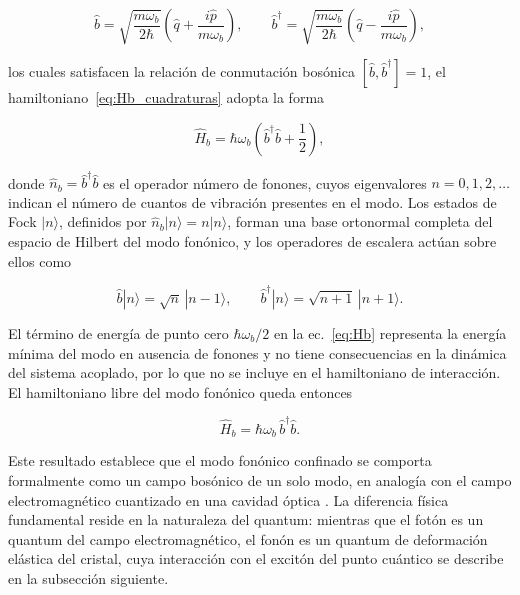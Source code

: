 \begin{equation}
	\hat{b} = \sqrt{\frac{m\omega_b}{2\hbar}}\left(\hat{q} +
	\frac{i\hat{p}}{m\omega_b}\right), \qquad
	\hat{b}^\dagger = \sqrt{\frac{m\omega_b}{2\hbar}}\left(\hat{q} -
	\frac{i\hat{p}}{m\omega_b}\right),
	\label{eq:b_def}
\end{equation}

los cuales satisfacen la relación de conmutación bosónica $[\hat{b},\hat{b}^\dagger] = 1$, el hamiltoniano~\eqref{eq:Hb_cuadraturas} adopta la forma

\begin{equation}
	\hat{H}_b = \hbar\omega_b\left(\hat{b}^\dagger\hat{b} +
	\frac{1}{2}\right),
	\label{eq:Hb}
\end{equation}

donde $\hat{n}_b = \hat{b}^\dagger\hat{b}$ es el operador número de fonones, cuyos eigenvalores $n = 0, 1, 2, \ldots$ indican el número de cuantos de vibración presentes en el modo. Los estados de Fock $|n\rangle$, definidos por $\hat{n}_b|n\rangle = n|n\rangle$, forman una base ortonormal completa del espacio de Hilbert del modo fonónico, y los operadores de escalera actúan sobre ellos como

\begin{equation}
	\hat{b}|n\rangle = \sqrt{n}\,|n-1\rangle, \qquad
	\hat{b}^\dagger|n\rangle = \sqrt{n+1}\,|n+1\rangle.
	\label{eq:escalera_fonon}
\end{equation}

El término de energía de punto cero $\hbar\omega_b/2$ en la ec.~\eqref{eq:Hb} representa la energía mínima del modo en ausencia de fonones y no tiene consecuencias en la dinámica del sistema acoplado, por lo que no se incluye en el hamiltoniano de interacción. El hamiltoniano libre del modo fonónico queda entonces

\begin{equation}
	\hat{H}_b = \hbar\omega_b\,\hat{b}^\dagger\hat{b}.
	\label{eq:Hb_final}
\end{equation}

Este resultado establece que el modo fonónico confinado se comporta formalmente como un campo bosónico de un solo modo, en analogía con el campo electromagnético cuantizado en una cavidad óptica \cite{gerry2005}. La diferencia física fundamental reside en la naturaleza del quantum: mientras que el fotón es un quantum del campo electromagnético, el fonón es un quantum de deformación elástica del cristal, cuya interacción con el excitón del punto cuántico se describe en la subsección siguiente.

